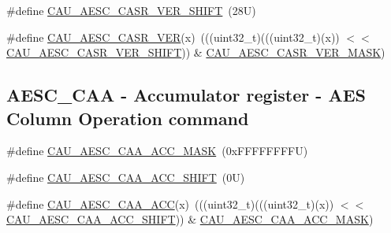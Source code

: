 \begin{DoxyCompactItemize}
\item 
\#define \mbox{\hyperlink{group___c_a_u___register___masks_ga14f13940abf0f6bc17f633206a387423}{C\+A\+U\+\_\+\+A\+E\+S\+C\+\_\+\+C\+A\+S\+R\+\_\+\+V\+E\+R\+\_\+\+S\+H\+I\+FT}}~(28\+U)
\item 
\#define \mbox{\hyperlink{group___c_a_u___register___masks_ga83db0296057530f6476583f9d45b9e26}{C\+A\+U\+\_\+\+A\+E\+S\+C\+\_\+\+C\+A\+S\+R\+\_\+\+V\+ER}}(x)~(((uint32\+\_\+t)(((uint32\+\_\+t)(x)) $<$$<$ \mbox{\hyperlink{group___c_a_u___register___masks_ga14f13940abf0f6bc17f633206a387423}{C\+A\+U\+\_\+\+A\+E\+S\+C\+\_\+\+C\+A\+S\+R\+\_\+\+V\+E\+R\+\_\+\+S\+H\+I\+FT}})) \& \mbox{\hyperlink{group___c_a_u___register___masks_ga5439d1e52f7e2cd76ac43c3a82b251ac}{C\+A\+U\+\_\+\+A\+E\+S\+C\+\_\+\+C\+A\+S\+R\+\_\+\+V\+E\+R\+\_\+\+M\+A\+SK}})
\end{DoxyCompactItemize}
\subsection*{A\+E\+S\+C\+\_\+\+C\+AA -\/ Accumulator register -\/ A\+ES Column Operation command}
\begin{DoxyCompactItemize}
\item 
\#define \mbox{\hyperlink{group___c_a_u___register___masks_ga3c6971358e98de3e28c7d2602473a3d3}{C\+A\+U\+\_\+\+A\+E\+S\+C\+\_\+\+C\+A\+A\+\_\+\+A\+C\+C\+\_\+\+M\+A\+SK}}~(0x\+F\+F\+F\+F\+F\+F\+F\+F\+U)
\item 
\#define \mbox{\hyperlink{group___c_a_u___register___masks_ga357ec43ab5d98d835aa90df3c8549123}{C\+A\+U\+\_\+\+A\+E\+S\+C\+\_\+\+C\+A\+A\+\_\+\+A\+C\+C\+\_\+\+S\+H\+I\+FT}}~(0\+U)
\item 
\#define \mbox{\hyperlink{group___c_a_u___register___masks_ga0a4a08f42b306c2eabc30c85fd071a6d}{C\+A\+U\+\_\+\+A\+E\+S\+C\+\_\+\+C\+A\+A\+\_\+\+A\+CC}}(x)~(((uint32\+\_\+t)(((uint32\+\_\+t)(x)) $<$$<$ \mbox{\hyperlink{group___c_a_u___register___masks_ga357ec43ab5d98d835aa90df3c8549123}{C\+A\+U\+\_\+\+A\+E\+S\+C\+\_\+\+C\+A\+A\+\_\+\+A\+C\+C\+\_\+\+S\+H\+I\+FT}})) \& \mbox{\hyperlink{group___c_a_u___register___masks_ga3c6971358e98de3e28c7d2602473a3d3}{C\+A\+U\+\_\+\+A\+E\+S\+C\+\_\+\+C\+A\+A\+\_\+\+A\+C\+C\+\_\+\+M\+A\+SK}})
\end{DoxyCompactItemize}

